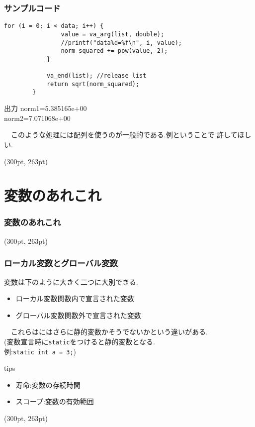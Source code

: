 \documentclass[dvipdfmx]{beamer}
\begin{document}
\begin{frame}[t, fragile, label=50]
    \frametitle{サンプルコード}
    \begin{lstlisting}[gobble=8, firstnumber=32, caption=pra\_func.c]
            for (i = 0; i < data; i++) {
                value = va_arg(list, double);
                //printf("data%d=%f\n", i, value);
                norm_squared += pow(value, 2);
            }
            
            va_end(list); //release list
            return sqrt(norm_squared);
        }
    \end{lstlisting}
    \begin{block}{出力}
        norm1=5.385165e+00\\
        norm2=7.071068e+00
    \end{block}
    　このような処理には配列を使うのが一般的である.例ということで
    許してほしい.
    \begin{textblock*}{0.3\linewidth}(300pt, 263pt)
    \hyperlink{49}{}
    \space
    \hyperlink{51}{}
    \end{textblock*}
\end{frame}

\section{変数のあれこれ}
\begin{frame}[label=51]
    \frametitle{変数のあれこれ}
    \tableofcontents[sections={2,9}]
    \begin{textblock*}{0.3\linewidth}(300pt, 263pt)
    \hyperlink{50}{}
    \space
    \hyperlink{52}{}
    \end{textblock*}
\end{frame}
\begin{frame}[c, fragile, label=52]
    \frametitle{ローカル変数とグローバル変数}
    変数は下のように大きく二つに大別できる.
    \begin{itemize}
        \item ローカル変数\qquad 関数内で宣言された変数
        \item グローバル変数\qquad 関数外で宣言された変数
    \end{itemize}
    　これらはにはさらに静的変数かそうでないかという違いがある.\\
    (変数宣言時に\texttt{static}をつけると静的変数となる.\\
    \qquad 例:\space \texttt{static int a = 3;})
    \begin{itembox}[l]{tips}
        \begin{itemize}
            \item 寿命:変数の存続時間
            \item スコープ:変数の有効範囲
        \end{itemize}
    \end{itembox}
    \begin{textblock*}{0.3\linewidth}(300pt, 263pt)
    \hyperlink{51}{}
    \space
    \hyperlink{53}{}
    \end{textblock*}
\end{frame}
\end{document}
